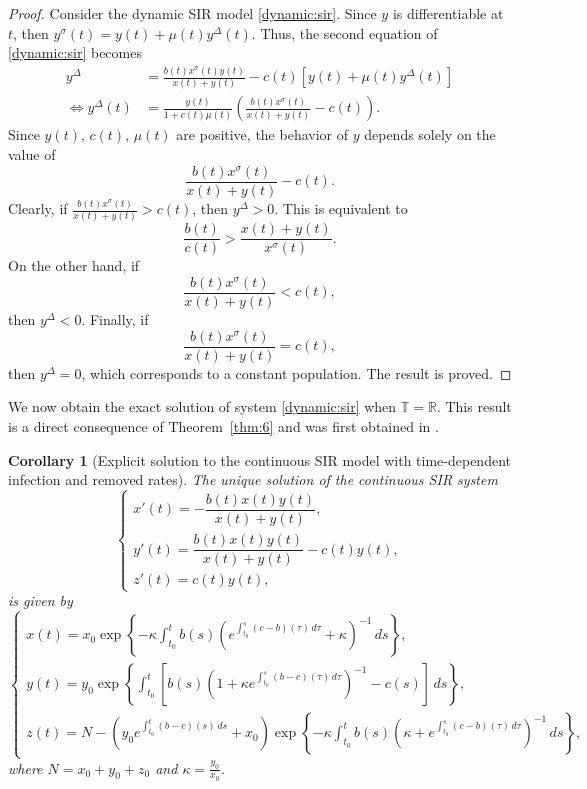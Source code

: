 \documentclass[pdflatex,sn-mathphys-num]{sn-jnl}
\newtheorem{corollary}{Corollary}
\theoremstyle{remark}
\begin{document}
\begin{proof}
Consider the dynamic SIR model \eqref{dynamic:sir}. 
Since $y$ is differentiable at $t$, then 
$y^{\sigma}(t) = y(t) + \mu(t)y^{\Delta}(t)$. Thus, the second equation of 
\eqref{dynamic:sir} becomes 
\begin{equation*}
\begin{aligned}
y^{\Delta} &= \frac{b(t)x^{\sigma}(t)y(t)}{x(t) + y(t)} - c(t)[y(t) + \mu(t)y^\Delta(t)]\\
\Leftrightarrow y^{\Delta}(t) &= \frac{y(t)}{1+c(t)\mu(t)}
\left(\frac{b(t)x^{\sigma}(t)}{x(t)+y(t)} - c(t)\right).
\end{aligned}
\end{equation*}
Since $y(t),\,c(t),\,\mu(t)$ are positive, the behavior of $y$ depends solely on 
the value of 
$$
\frac{b(t)x^{\sigma}(t)}{x(t)+y(t)} - c(t).
$$
Clearly, if $\frac{b(t)x^{\sigma}(t)}{x(t)+y(t)} > c(t)$, then $y^{\Delta} > 0$. This
is equivalent to 
$$
\frac{b(t)}{c(t)} > \frac{x(t)+y(t)}{x^{\sigma}(t)}.
$$
On the other hand, if 
$$
\frac{b(t)x^{\sigma}(t)}{x(t)+y(t)} < c(t),
$$ 
then $y^{\Delta} < 0$. Finally, if 
$$
\frac{b(t)x^{\sigma}(t)}{x(t)+y(t)} = c(t),
$$
then $y^{\Delta} = 0$, which corresponds to a constant population. 
The result is proved. 
\end{proof}

We now obtain the exact solution of system \eqref{dynamic:sir} when 
$\mathbb{T} = \mathbb{R}$. This result is a direct consequence of 
Theorem~\ref{thm:6} and was first obtained in \cite{sir:ts}.

\begin{corollary}[Explicit solution to the continuous SIR model with time-dependent 
infection and removed rates]
The unique solution of the continuous SIR system 
\begin{equation}
\label{sir:continuous2}
\begin{cases}
x'(t) = -\dfrac{b(t) x(t) y(t)}{x(t)+y(t)}, \\
y'(t) = \dfrac{b(t) x(t) y(t)}{x(t)+y(t)} - c(t)y(t), \\
z'(t) = c(t)y(t),
\end{cases}
\end{equation}
is given by
\begin{equation}
\label{exact:cont}
\begin{cases}
\displaystyle
x(t) = x_0 \exp\left\{-\kappa \int_{t_0}^t b(s) 
\left(e^{\int_{t_0}^{s}(c-b)(\tau)\,d\tau} + \kappa\right)^{-1}\,ds\right\},\\
\displaystyle
y(t) = y_0 \exp\left\{\int_{t_0}^{t}\left[b(s)\left(1 + \kappa
e^{\int_{t_0}^{s}(b-c)(\tau)\,d\tau}\right)^{-1} - c(s)\right]\,ds\right\},\\
\displaystyle
z(t) = N - \left(y_0e^{\int_{t_0}^t (b-c)(s)\,ds} + x_0\right)
\exp\left\{-\kappa\int_{t_0}^{t} b(s)\left(\kappa + 
e^{\int_{t_0}^s (c-b)(\tau)\,d\tau}\right)^{-1}\,ds\right\},
\end{cases}
\end{equation}
where $N = x_0 + y_0 + z_0$ and $\kappa = \frac{y_0}{x_0}$.
\end{corollary}
\end{document}
